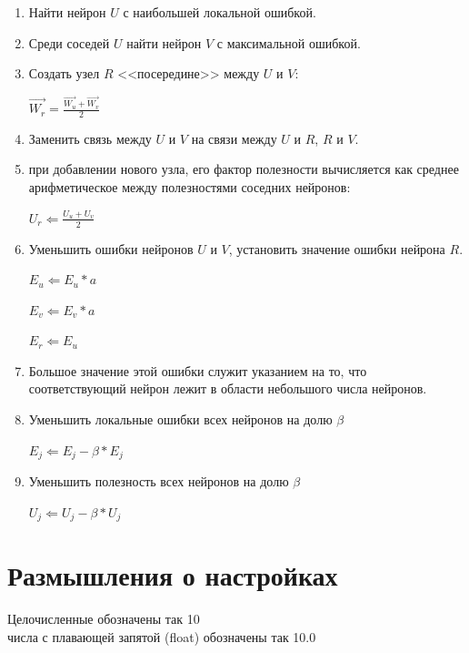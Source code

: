 \documentclass[unicode, 12pt, a4paper,oneside,fleqn]{article}
\begin{document}
\begin{enumerate}
\item \label{gng-u:13} \label{gng:12}
  Найти нейрон $U$ с наибольшей локальной ошибкой.

\item \label{gng-u:14} \label{gng:13}
  Среди соседей $U$ найти нейрон $V$ с максимальной ошибкой.

\item \label{gng-u:15} \label{gng:14}
  Создать узел $R$ <<посередине>> между $U$ и $V$:

  $\vec{W_r}=\frac{\vec{W_u} + \vec{W_v}}{2}$

\item \label{gng-u:16} \label{gng:15}
  Заменить связь между $U$ и $V$ на связи между $U$ и $R$, $R$ и
  $V$.

\item \label{gng-u:17} %
  при добавлении нового узла, его фактор полезности вычисляется как
  среднее арифметическое между полезностями соседних нейронов:

  $U_r \Leftarrow \frac{U_u + U_v}{2}$

\item \label{gng-u:18} \label{gng:16}
  Уменьшить ошибки нейронов $U$ и $V$, установить значение ошибки
  нейрона $R$.

  $E_u \Leftarrow E_u*a$
  
  $E_v \Leftarrow E_v*a$
  
  $E_r \Leftarrow E_u$

\item \label{gng-u:19} \label{gng:17}
  Большое значение этой ошибки служит указанием на то, что
  соответствующий нейрон лежит в области небольшого числа нейронов.

\item \label{gng-u:20} \label{gng:18}
  Уменьшить локальные ошибки всех нейронов на долю $\beta$
  
  $E_j \Leftarrow E_j - \beta*E_j$

\item \label{gng-u:21} %
  Уменьшить полезность всех нейронов на долю $\beta$

  $U_j \Leftarrow U_j - \beta*U_j$

\end{enumerate}


\section{Размышления о настройках}
Целочисленные обозначены так 10\\
числа с плавающей запятой (float) обозначены так 10.0
\end{document}
